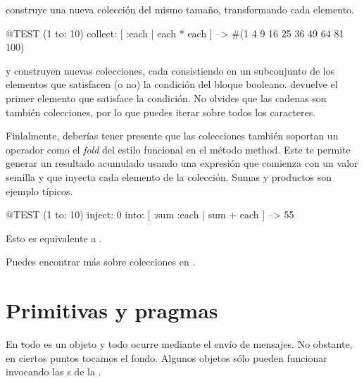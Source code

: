 \documentclass[a4paper,10pt,twoside]{book}
\begin{document}

 construye una nueva colección del mismo tamaño, transformando cada elemento.
\begin{code}{@TEST}
(1 to: 10) collect: [ :each | each * each ] --> #(1 4 9 16 25 36 49 64 81 100)
\end{code}

 y  construyen nuevas colecciones, cada consistiendo en un subconjunto de los elementos que satisfacen (o no) la condición del bloque booleano.
 devuelve el primer elemento que satisface la condición.
No olvides que las cadenas son también colecciones, por lo que puedes iterar sobre todos los caracteres.


Finlalmente, deberías tener presente que las colecciones también soportan un operador como el \emph{fold} del estilo funcional en el método  method.
Este te permite generar un resultado acumulado usando una expresión que comienza con un valor semilla y que inyecta cada elemento de la colección.
Sumas y productos son ejemplo típicos.

\begin{code}{@TEST}
(1 to: 10) inject: 0 into: [ :sum :each | sum + each ] --> 55
\end{code}

\noindent
Esto es equivalente a .

Puedes encontrar más sobre colecciones en  .

\section{Primitivas y pragmas}

En \st todo es un objeto y todo ocurre mediante el envío de mensajes.
No obstante, en ciertos puntos tocamos el fondo.
Algunos objetos sólo pueden funcionar invocando las s de la .
\end{document}
